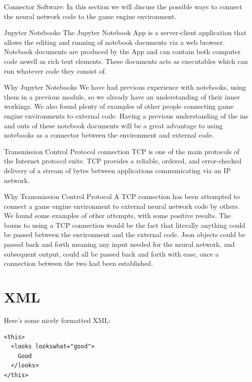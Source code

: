 Connector Software:
In this section we will discuss the possible ways to connect the neural network code to the game engine environment.

Jupyter Notebooks
The Jupyter Notebook App is a server-client application that allows the editing and running of notebook documents via a web browser. Notebook documents are produced by the App and can contain both computer code aswell as rich text elements. These documents acts as executables which can run whatever code they consist of.

Why Jupyter Notebooks
We have had previous experience with notebooks, using them in a previous module, so we already have an understanding of their inner workings. We also found plenty of examples of other people connecting game engine environments to  external code. Having a previous understanding of the ins and outs of these notebook documents will be a great advantage to using notebooks as a connector between the environment and external code.


Transmission Control Protocol connection
TCP is one of the main protocols of the Internet protocol suite. TCP provides a reliable, ordered, and error-checked delivery of a stream of bytes between applications communicating via an IP network. 

Why Transmission Control Protocol
A TCP connection has been attempted to connect a game engine environment to external neural network code by others. We found some examples of other attempts, with some positive results. The bonus to using a TCP connection would be the fact that literally anything could be passed between the environment and the external code. Json objects could be passed back and forth meaning any input needed for the neural network, and subsequent output, could all be passed back and forth with ease, once a connection between the two had been established.

\section{XML}
Here's some nicely formatted XML:
\begin{verbatim}
<this>
  <looks lookswhat="good">
    Good
  </looks>
</this>
\end{verbatim}
